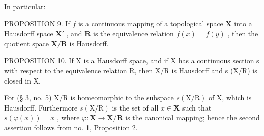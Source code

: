 In particular:

PROPOSITION 9. If \(f\) is a continuous mapping of a topological space \(\mathbf{X}\) into a Hausdorff space \(\mathbf{X}'\) , and \(\mathbf{R}\) is the equivalence relation \(f(x) = f(y)\) , then the quotient space \(\mathbf{X} / \mathbf{R}\) is Hausdorff.

PROPOSITION 10. If X is a Hausdorff space, and if X has a continuous section s with respect to the equivalence relation R, then X/R is Hausdorff and s (X/R) is closed in X.

For (§ 3, no. 5) X/R is homeomorphic to the subspace \(s(\mathrm{X}/\mathrm{R})\) of X, which is Hausdorff. Furthermore \(s(\mathrm{X}/\mathrm{R})\) is the set of all \(x \in \mathbf{X}\) such that \(s(\varphi(x)) = x\) , where \(\varphi: \mathbf{X} \to \mathbf{X}/\mathbf{R}\) is the canonical mapping; hence the second assertion follows from no. 1, Proposition 2.

